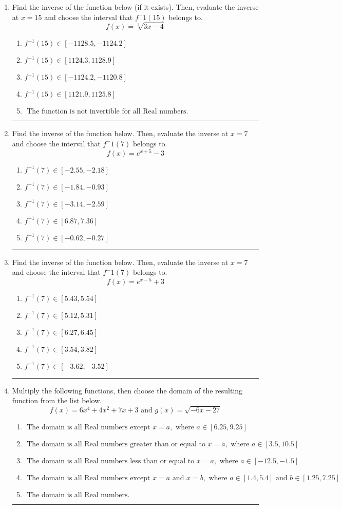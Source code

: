 \documentclass[14pt]{extbook}
\newcommand{\litem}[1]{\item#1\hspace*{-1cm}\rule{\textwidth}{0.4pt}}
\begin{document}
\begin{enumerate}
\litem{
Find the inverse of the function below (if it exists). Then, evaluate the inverse at $x = 15$ and choose the interval that $f^-1(15)$ belongs to.\[ f(x) = \sqrt[3]{3 x - 4} \]\begin{enumerate}[label=\Alph*.]
\item \( f^{-1}(15) \in [-1128.5, -1124.2] \)
\item \( f^{-1}(15) \in [1124.3, 1128.9] \)
\item \( f^{-1}(15) \in [-1124.2, -1120.8] \)
\item \( f^{-1}(15) \in [1121.9, 1125.8] \)
\item \( \text{ The function is not invertible for all Real numbers. } \)

\end{enumerate} }
\litem{
Find the inverse of the function below. Then, evaluate the inverse at $x = 7$ and choose the interval that $f^-1(7)$ belongs to.\[ f(x) = e^{x+5}-3 \]\begin{enumerate}[label=\Alph*.]
\item \( f^{-1}(7) \in [-2.55, -2.18] \)
\item \( f^{-1}(7) \in [-1.84, -0.93] \)
\item \( f^{-1}(7) \in [-3.14, -2.59] \)
\item \( f^{-1}(7) \in [6.87, 7.36] \)
\item \( f^{-1}(7) \in [-0.62, -0.27] \)

\end{enumerate} }
\litem{
Find the inverse of the function below. Then, evaluate the inverse at $x = 7$ and choose the interval that $f^-1(7)$ belongs to.\[ f(x) = e^{x-5}+3 \]\begin{enumerate}[label=\Alph*.]
\item \( f^{-1}(7) \in [5.43, 5.54] \)
\item \( f^{-1}(7) \in [5.12, 5.31] \)
\item \( f^{-1}(7) \in [6.27, 6.45] \)
\item \( f^{-1}(7) \in [3.54, 3.82] \)
\item \( f^{-1}(7) \in [-3.62, -3.52] \)

\end{enumerate} }
\litem{
Multiply the following functions, then choose the domain of the resulting function from the list below.\[ f(x) = 6x^{4} +4 x^{2} +7 x + 3 \text{ and } g(x) = \sqrt{-6x-27}  \]\begin{enumerate}[label=\Alph*.]
\item \( \text{ The domain is all Real numbers except } x = a, \text{ where } a \in [6.25, 9.25] \)
\item \( \text{ The domain is all Real numbers greater than or equal to } x = a, \text{ where } a \in [3.5, 10.5] \)
\item \( \text{ The domain is all Real numbers less than or equal to } x = a, \text{ where } a \in [-12.5, -1.5] \)
\item \( \text{ The domain is all Real numbers except } x = a \text{ and } x = b, \text{ where } a \in [1.4, 5.4] \text{ and } b \in [1.25, 7.25] \)
\item \( \text{ The domain is all Real numbers. } \)


\end{enumerate}}
\end{enumerate}
\end{document}
